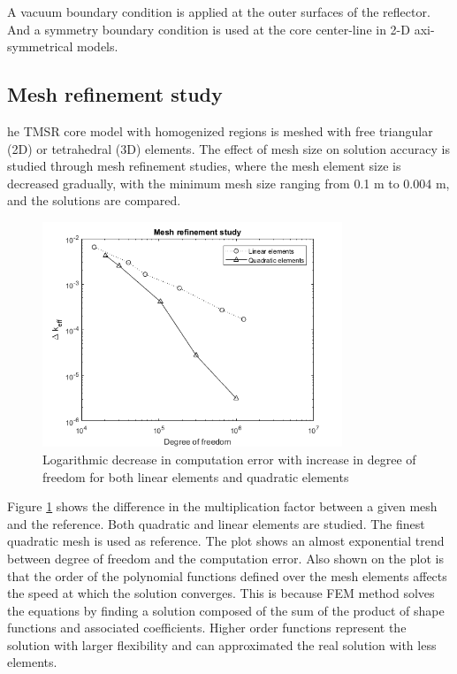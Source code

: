 \documentclass{elsarticle}
\begin{document}
A vacuum boundary condition is applied at the outer surfaces of the reflector. And a symmetry boundary condition is used at the core center-line in 2-D axi-symmetrical models.




\subsection{Mesh refinement study}
he TMSR core model with homogenized regions is meshed with free triangular (2D) or tetrahedral (3D) elements. The effect of mesh size on solution accuracy is studied through mesh refinement studies, where the mesh element size is decreased gradually, with the minimum mesh size ranging from 0.1 m to 0.004 m, and the solutions are compared. 

\begin{figure}
\centering
    \includegraphics[width = 0.8\textwidth]{./images/diffusion/tmsr/mesh_refinement.png}  
    \caption{Logarithmic decrease in computation error with increase in degree of freedom for both linear elements and quadratic elements}
    \label{fig:mesh_refinement}
\end{figure}

Figure \ref{fig:mesh_refinement} shows the difference in the multiplication factor between a given mesh and the reference. Both quadratic and linear elements are studied. The finest quadratic mesh is used as reference. The plot shows an almost exponential trend between degree of freedom and the computation error. 
Also shown on the plot is that the order of the polynomial functions defined over the mesh elements affects the speed at which the solution converges. This is because FEM method solves the equations by finding a solution composed of the sum of the product of shape functions and associated coefficients. Higher order functions represent the solution with larger flexibility and can approximated the real solution with less elements. 
 
\end{document}
